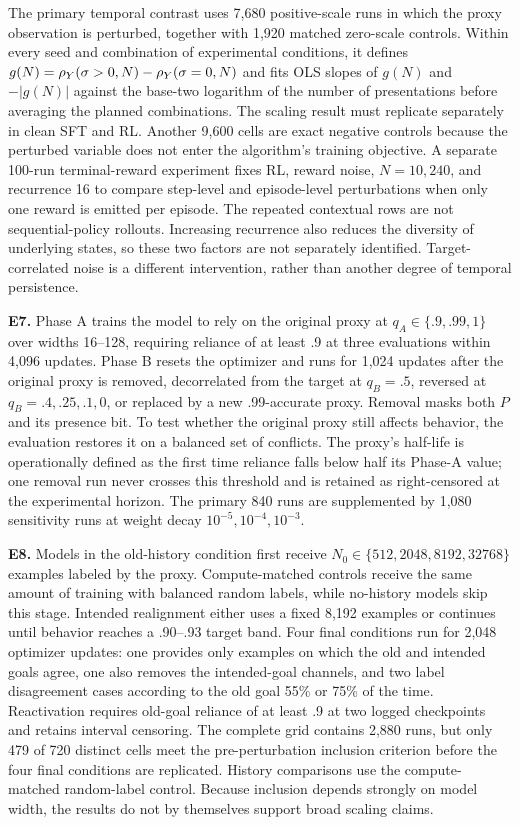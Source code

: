 The primary temporal contrast uses 7,680 positive-scale runs in which the proxy observation is perturbed, together with 1,920 matched zero-scale controls. Within every seed and combination of experimental conditions, it defines $g(N)=\rho_Y(\sigma>0,N)-\rho_Y(\sigma=0,N)$ and fits OLS slopes of $g(N)$ and $-|g(N)|$ against the base-two logarithm of the number of presentations before averaging the planned combinations. The scaling result must replicate separately in clean SFT and RL. Another 9,600 cells are exact negative controls because the perturbed variable does not enter the algorithm's training objective. A separate 100-run terminal-reward experiment fixes RL, reward noise, $N=10,240$, and recurrence 16 to compare step-level and episode-level perturbations when only one reward is emitted per episode. The repeated contextual rows are not sequential-policy rollouts. Increasing recurrence also reduces the diversity of underlying states, so these two factors are not separately identified. Target-correlated noise is a different intervention, rather than another degree of temporal persistence.

\textbf{E7.} Phase A trains the model to rely on the original proxy at $q_A\in\{.9,.99,1\}$ over widths 16--128, requiring reliance of at least .9 at three evaluations within 4,096 updates. Phase B resets the optimizer and runs for 1,024 updates after the original proxy is removed, decorrelated from the target at $q_B=.5$, reversed at $q_B=.4,.25,.1,0$, or replaced by a new .99-accurate proxy. Removal masks both $P$ and its presence bit. To test whether the original proxy still affects behavior, the evaluation restores it on a balanced set of conflicts. The proxy's half-life is operationally defined as the first time reliance falls below half its Phase-A value; one removal run never crosses this threshold and is retained as right-censored at the experimental horizon. The primary 840 runs are supplemented by 1,080 sensitivity runs at weight decay $10^{-5},10^{-4},10^{-3}$.

\textbf{E8.} Models in the old-history condition first receive $N_0\in\{512,2048,8192,32768\}$ examples labeled by the proxy. Compute-matched controls receive the same amount of training with balanced random labels, while no-history models skip this stage. Intended realignment either uses a fixed 8,192 examples or continues until behavior reaches a .90--.93 target band. Four final conditions run for 2,048 optimizer updates: one provides only examples on which the old and intended goals agree, one also removes the intended-goal channels, and two label disagreement cases according to the old goal 55\% or 75\% of the time. Reactivation requires old-goal reliance of at least .9 at two logged checkpoints and retains interval censoring. The complete grid contains 2,880 runs, but only 479 of 720 distinct cells meet the pre-perturbation inclusion criterion before the four final conditions are replicated. History comparisons use the compute-matched random-label control. Because inclusion depends strongly on model width, the results do not by themselves support broad scaling claims.

